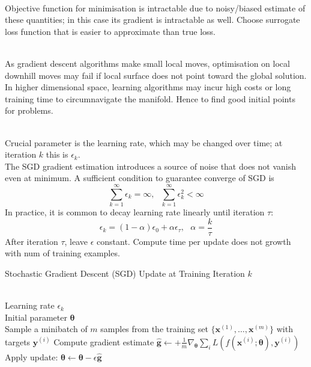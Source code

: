 \begin{remark} \\
Objective function for minimisation is intractable due to noisy/biased estimate of these quantities; in this case its gradient is intractable as well. Choose surrogate loss function that is easier to approximate than true loss.
\end{remark}

\begin{remark} \\
As gradient descent algorithms make small local moves, optimisation on local downhill moves may fail if local surface does not point toward the global solution. In higher dimensional space, learning algorithms may incur high costs or long training time to circumnavigate the manifold. Hence to find good initial points for problems.
\end{remark}

\begin{remark} \\
Crucial parameter is the learning rate, which may be changed over time; at iteration $k$ this is $\epsilon_k$.\\
The SGD gradient estimation introduces a source of noise that does not vanish even at minimum. A sufficient condition to guarantee converge of SGD is
\begin{equation}
\sum\limits_{k=1}^{\infty} \epsilon_k = \infty, \ \ \ \sum\limits_{k=1}^{\infty} \epsilon_k^2 < \infty \nonumber
\end{equation}
In practice, it is common to decay learning rate linearly until iteration $\tau$:
\begin{equation}
\epsilon_k = (1- \alpha)\epsilon_0 + \alpha \epsilon_{\tau}, \ \ \ \alpha = \frac{k}{\tau} \nonumber
\end{equation}
After iteration $\tau$, leave $\epsilon$ constant. Compute time per update does not growth with num of training examples.
\end{remark}

\begin{breakablealgorithm}
\caption{Stochastic Gradient Descent (SGD) Update at Training Iteration $k$}
\begin{algorithmic}
\Require \\
Learning rate $\epsilon_k$\\
Initial parameter $\bm{\theta}$\\

\State Sample a minibatch of $m$ samples from the training set $\{\bm{x}^{(1)}, \ldots, \bm{x}^{(m)} \}$ with targets $\bm{y}^{(i)}$
\State Compute gradient estimate $\hat{\bm{g}} \leftarrow + \frac{1}{m} \nabla_{\bm{\theta}} \sum_{i} L(f(\bm{x}^{(i)}; \bm{\theta}), \bm{y}^{(i)})$
\State Apply update: $\bm{\theta} \leftarrow \bm{\theta} - \epsilon \hat{\bm{g}}$
\EndWhile
\end{algorithmic}
\end{breakablealgorithm}

